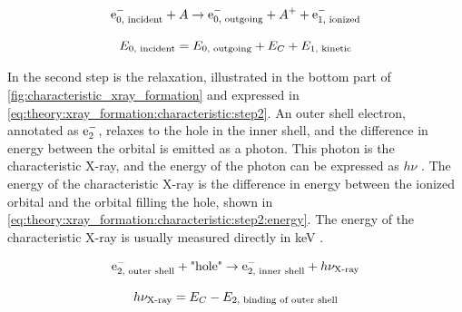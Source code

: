 \begin{equation}
    \label{eq:theory:xray_formation:characteristic:step1}
    \textnormal{e}^-_{0 \textnormal{, incident}} + A \rightarrow \textnormal{e}^-_{0 \textnormal{, outgoing}} + A^+ + \textnormal{e}^-_{1 \textnormal{, ionized}}
\end{equation}

\begin{equation}
    \label{eq:theory:xray_formation:characteristic:step1:energy_balance}
    E_{0 {\textnormal{, incident}}} = E_{0 {\textnormal{, outgoing}}} + E_{C} + E_{1 {\textnormal{, kinetic}}}
\end{equation}




In the second step is the relaxation, illustrated in the bottom part of \cref{fig:characteristic_xray_formation} and expressed in \cref{eq:theory:xray_formation:characteristic:step2}.
An outer shell electron, annotated as $\textnormal{e}^-_{2}$, relaxes to the hole in the inner shell, and the difference in energy between the orbital is emitted as a photon.
This photon is the characteristic X-ray, and the energy of the photon can be expressed as $h\nu$ \cite[Eq. (8.12)]{hollas_modern_2004}.
The energy of the characteristic X-ray is the difference in energy between the ionized orbital and the orbital filling the hole, shown in \cref{eq:theory:xray_formation:characteristic:step2:energy}.
The energy of the characteristic X-ray is usually measured directly in keV \cite[Eq. (4.2b)]{goldstein_scanning_2018}.


\begin{equation}
    \label{eq:theory:xray_formation:characteristic:step2}
    \textnormal{e}^-_{2 {\textnormal{, outer shell}}} + \textnormal{"hole"} \rightarrow \textnormal{e}^-_{2 {\textnormal{, inner shell}}} + h\nu_{\textnormal{X-ray}}
\end{equation}


\begin{equation}
    \label{eq:theory:xray_formation:characteristic:step2:energy}
    h\nu_{\textnormal{X-ray}} = E_C - E_{2 {\textnormal{, binding of outer shell}}}
\end{equation}



